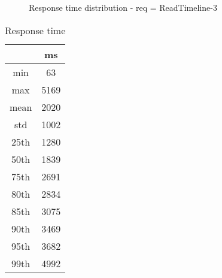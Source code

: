 \begin{minipage}{0.75\linewidth}
\begin{figure}[h]
\begin{adjustbox}{max width=1.0\linewidth, keepaspectratio}
  \end{adjustbox}
  \caption{Response time distribution - req = ReadTimeline-3}
\end{figure}
\end{minipage}\hfill\begin{minipage}{0.18\linewidth}
\begin{table}[h]
\begin{tabular}{|cc|}
\hline
\textbf{} & \textbf{ms}\\ \hline
 \Xhline{0.005\arrayrulewidth}
min & 63\\
 \Xhline{0.005\arrayrulewidth}
max & 5169\\
 \Xhline{0.005\arrayrulewidth}
mean & 2020\\
 \Xhline{0.005\arrayrulewidth}
std & 1002\\
\hline
\hline
 \Xhline{0.005\arrayrulewidth}
25th & 1280\\
 \Xhline{0.005\arrayrulewidth}
50th & 1839\\
 \Xhline{0.005\arrayrulewidth}
75th & 2691\\
 \Xhline{0.005\arrayrulewidth}
80th & 2834\\
 \Xhline{0.005\arrayrulewidth}
85th & 3075\\
 \Xhline{0.005\arrayrulewidth}
90th & 3469\\
 \Xhline{0.005\arrayrulewidth}
95th & 3682\\
 \Xhline{0.005\arrayrulewidth}
99th & 4992\\
\hline
\end{tabular}
\caption{Response time}
\end{table}
\end{minipage}\hfill